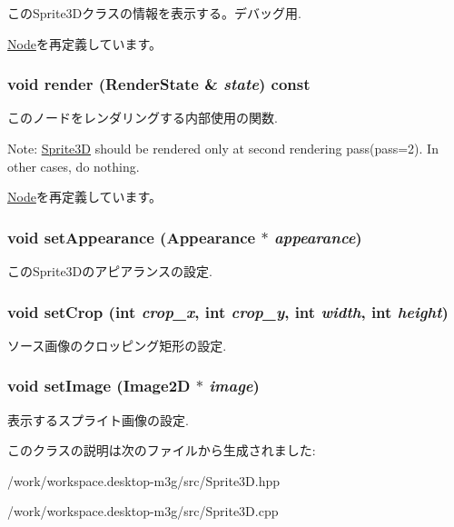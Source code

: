 このSprite3Dクラスの情報を表示する。デバッグ用. 

\hyperlink{classm3g_1_1Node_6fea17fa1532df3794f8cb39cb4f911f}{Node}を再定義しています。\hypertarget{classm3g_1_1Sprite3D_8babc8a79b78615da51161e94029eea9}{
\subsubsection[{render}]{\setlength{\rightskip}{0pt plus 5cm}void render ({\bf RenderState} \& {\em state}) const}}
\label{classm3g_1_1Sprite3D_8babc8a79b78615da51161e94029eea9}


このノードをレンダリングする内部使用の関数.

Note: \hyperlink{classm3g_1_1Sprite3D}{Sprite3D} should be rendered only at second rendering pass(pass=2). In other cases, do nothing. 

\hyperlink{classm3g_1_1Node_8babc8a79b78615da51161e94029eea9}{Node}を再定義しています。\hypertarget{classm3g_1_1Sprite3D_b9b44bad4241635062ed66437c9bae48}{
\subsubsection[{setAppearance}]{\setlength{\rightskip}{0pt plus 5cm}void setAppearance ({\bf Appearance} $\ast$ {\em appearance})}}
\label{classm3g_1_1Sprite3D_b9b44bad4241635062ed66437c9bae48}


このSprite3Dのアピアランスの設定. \hypertarget{classm3g_1_1Sprite3D_35ca6d3ff64f2232a0f3a11bf4ab483e}{
\subsubsection[{setCrop}]{\setlength{\rightskip}{0pt plus 5cm}void setCrop (int {\em crop\_\-x}, \/  int {\em crop\_\-y}, \/  int {\em width}, \/  int {\em height})}}
\label{classm3g_1_1Sprite3D_35ca6d3ff64f2232a0f3a11bf4ab483e}


ソース画像のクロッピング矩形の設定. \hypertarget{classm3g_1_1Sprite3D_705b89b41cd1b38f664ed912be44baaa}{
\subsubsection[{setImage}]{\setlength{\rightskip}{0pt plus 5cm}void setImage ({\bf Image2D} $\ast$ {\em image})}}
\label{classm3g_1_1Sprite3D_705b89b41cd1b38f664ed912be44baaa}


表示するスプライト画像の設定. 

このクラスの説明は次のファイルから生成されました:\begin{CompactItemize}
\item 
/work/workspace.desktop-m3g/src/Sprite3D.hpp\item 
/work/workspace.desktop-m3g/src/Sprite3D.cpp\end{CompactItemize}
